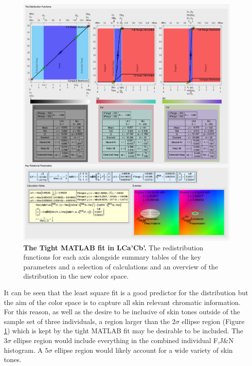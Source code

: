 \begin{figure}[h!]
  \centering
  \includegraphics[width=1.0 \textwidth]{Chapter3/Figs/Distribution_Results_Final.jpg} 
    \caption{ \textbf{The Tight MATLAB fit in LCa'Cb'.} The redistribution functions for each axis alongside summary tables of the key parameters and a selection of calculations and an overview of the distribution in the new color space.}  \label{fig:DistributionResultsFinal}
\end{figure}

It can be seen that the least square fit is a good predictor for the distribution but the aim of the color space is to capture all skin relevant chromatic information. For this reason,  as well as the desire to be inclusive of skin tones outside of the sample set of three individuals, a region larger than the $2\sigma$ ellipse region (Figure \ref{fig:DistributionResultsFinal}) which is kept by the tight MATLAB fit may be desirable to be included. The $3\sigma$ ellipse region would include everything in the combined individual F,J\&N histogram. A $5\sigma$ ellipse region would  likely account for a wide variety of skin tones. 

